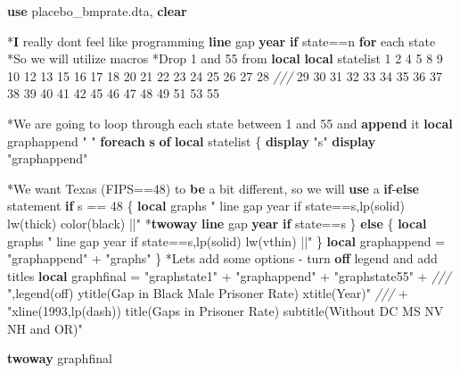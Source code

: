 \documentclass[
]{book}
\newenvironment{Shaded}{\begin{snugshade}}{\end{snugshade}}
\newcommand{\BaseNTok}[1]{\textcolor[rgb]{0.00,0.00,0.81}{#1}}
\newcommand{\CommentTok}[1]{\textcolor[rgb]{0.56,0.35,0.01}{\textit{#1}}}
\newcommand{\FunctionTok}[1]{\textcolor[rgb]{0.13,0.29,0.53}{\textbf{#1}}}
\newcommand{\KeywordTok}[1]{\textcolor[rgb]{0.13,0.29,0.53}{\textbf{#1}}}
\newcommand{\NormalTok}[1]{#1}
\newcommand{\OtherTok}[1]{\textcolor[rgb]{0.56,0.35,0.01}{#1}}
\newcommand{\StringTok}[1]{\textcolor[rgb]{0.31,0.60,0.02}{#1}}
\begin{document}
\begin{Shaded}
\begin{Highlighting}[]
\KeywordTok{use}\NormalTok{ placebo\_bmprate.dta, }\KeywordTok{clear}

\NormalTok{*}\FunctionTok{I}\NormalTok{ really don\textquotesingle{}t feel like programming }\KeywordTok{line}\NormalTok{ gap }\FunctionTok{year} \KeywordTok{if}\NormalTok{ state==n }\KeywordTok{for}\NormalTok{ each state}
\NormalTok{*So we will utilize macros }
\NormalTok{*Drop 1 and 55 from }\KeywordTok{local}
\KeywordTok{local}\NormalTok{ statelist  1 2 4 5 8 9 10 12 13 15 16 17 18 20 21 22 23 24 25 26 27 28 }\CommentTok{///}
\NormalTok{                 29 30 31 32 33 34 35 36 37 38 39 40 41 42 45 46 47 48 49 51 53 55}

\NormalTok{*We are going to loop through each state between 1 and 55 and }\KeywordTok{append}\NormalTok{ it}
\KeywordTok{local}\NormalTok{ graphappend }\StringTok{" "}
\KeywordTok{foreach} \FunctionTok{s} \KeywordTok{of} \KeywordTok{local}\NormalTok{ statelist \{}
  \KeywordTok{display} \StringTok{"\textasciigrave{}s\textquotesingle{}"}
  \KeywordTok{display} \StringTok{"\textasciigrave{}graphappend\textquotesingle{}"}

\NormalTok{  *We want Texas (FIPS==48) to }\KeywordTok{be}\NormalTok{ a bit different, so we will }\KeywordTok{use}\NormalTok{ a }\KeywordTok{if}\NormalTok{{-}}\KeywordTok{else}\NormalTok{ statement}
  \KeywordTok{if} \OtherTok{\textasciigrave{}s\textquotesingle{}}\NormalTok{ == 48 \{}
    \KeywordTok{local}\NormalTok{ graph}\OtherTok{\textasciigrave{}s\textquotesingle{}} \StringTok{" line gap year if state==\textasciigrave{}s\textquotesingle{},lp(solid) lw(thick) color(black) ||"}
\NormalTok{    *}\KeywordTok{twoway} \KeywordTok{line}\NormalTok{ gap }\FunctionTok{year} \KeywordTok{if}\NormalTok{ state==}\OtherTok{\textasciigrave{}s\textquotesingle{}}
\NormalTok{  \}}
  \KeywordTok{else}\NormalTok{ \{}
    \KeywordTok{local}\NormalTok{ graph}\OtherTok{\textasciigrave{}s\textquotesingle{}} \StringTok{" line gap year if state==\textasciigrave{}s\textquotesingle{},lp(solid) lw(vthin) ||"}
\NormalTok{  \}}
  \KeywordTok{local}\NormalTok{ graphappend = }\StringTok{"\textasciigrave{}graphappend\textquotesingle{}"}\NormalTok{ + }\StringTok{"\textasciigrave{}graph\textasciigrave{}s\textquotesingle{}\textquotesingle{}"} 
\NormalTok{\}}
\NormalTok{*Let\textquotesingle{}s add some options {-} turn }\KeywordTok{off} \BaseNTok{legend}\NormalTok{ and add titles}
\KeywordTok{local}\NormalTok{ graphfinal = }\StringTok{"\textasciigrave{}graphstate1\textquotesingle{}"}\NormalTok{ + }\StringTok{"\textasciigrave{}graphappend\textquotesingle{}"}\NormalTok{ + }\StringTok{"\textasciigrave{}graphstate55\textquotesingle{}"}\NormalTok{ + }\CommentTok{///}
                   \StringTok{",legend(off) ytitle(Gap in Black Male Prisoner Rate) xtitle(Year)"} \CommentTok{///}
\NormalTok{                   + }\StringTok{"xline(1993,lp(dash)) title(Gaps in Prisoner Rate) subtitle(Without DC MS NV NH and OR)"}

\KeywordTok{twoway} \OtherTok{\textasciigrave{}graphfinal\textquotesingle{}}
\end{Highlighting}
\end{Shaded}
\end{document}
